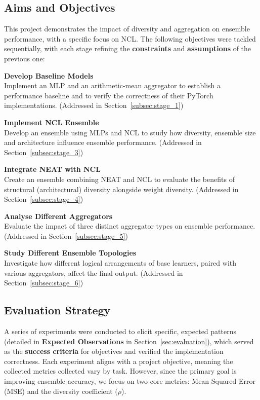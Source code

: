 \subsection{Aims and Objectives}
This project demonstrates the impact of diversity and aggregation on ensemble performance, with a specific focus on NCL. The following objectives were tackled sequentially, with each stage refining the \textbf{constraints} and \textbf{assumptions} of the previous one: 
\begin{description}[style=multiline, leftmargin=2cm, font=\bfseries]
    \item[Stage 1] \textbf{Develop Baseline Models} \\
    Implement an MLP and an arithmetic-mean aggregator to establish a performance baseline and to verify the correctness of their PyTorch implementations. (Addressed in Section~\ref{subsec:stage_1})

    \item[Stage 2] \textbf{Implement NCL Ensemble} \\
    Develop an ensemble using MLPs and NCL to study how diversity, ensemble size and architecture influence ensemble performance.  (Addressed in Section~\ref{subsec:stage_3})

    \item[Stage 3] \textbf{Integrate NEAT with NCL} \\
    Create an ensemble combining NEAT and NCL to evaluate the benefits of structural (architectural) diversity alongside weight diversity.  (Addressed in Section~\ref{subsec:stage_4})

    \item[Stage 4] \textbf{Analyse Different Aggregators} \\
    Evaluate the impact of three distinct aggregator types on ensemble performance.  (Addressed in Section~\ref{subsec:stage_5})

    \item[Stage 5] \textbf{Study Different Ensemble Topologies} \\
    Investigate how different logical arrangements of base learners, paired with various aggregators, affect the final output.  (Addressed in Section~\ref{subsec:stage_6})
\end{description}


\subsection{Evaluation Strategy}
A series of experiments were conducted to elicit specific, expected patterns (detailed in \textbf{Expected Observations} in Section~\ref{sec:evaluation}), which served as the \textbf{success criteria} for objectives and verified the implementation correctness. Each experiment aligns with a project objective, meaning the collected metrics collected vary by task. However, since the primary goal is improving ensemble accuracy, we focus on two core metrics: Mean Squared Error (MSE) and the diversity coefficient ($\rho$). 


